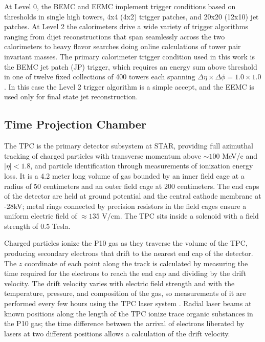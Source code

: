 At Level 0, the BEMC and EEMC implement trigger conditions based on thresholds in single high towers, 4x4 (4x2) trigger patches, and 20x20 (12x10) jet patches.  At Level 2 the calorimeters drive a wide variety of trigger algorithms ranging from dijet reconstructions that span seamlessly across the two calorimeters to heavy flavor searches doing online calculations of tower pair invariant masses.  The primary calorimeter trigger condition used in this work is the BEMC jet patch (JP) trigger, which requires an energy sum above threshold in one of twelve fixed collections of 400 towers each spanning $\Delta \eta \times \Delta \phi = 1.0 \times 1.0$.  In this case the Level 2 trigger algorithm is a simple accept, and the EEMC is used only for final state jet reconstruction.


\subsection{Time Projection Chamber}

The TPC \cite{Anderson:2003ur} is the primary detector subsystem at STAR, providing full azimuthal tracking of charged particles with transverse momentum above $\sim 100$ MeV/c and $|\eta| < 1.8$, and particle identification through measurements of ionization energy loss.  It is a 4.2 meter long volume of gas bounded by an inner field cage at a radius of 50 centimeters and an outer field cage at 200 centimeters.  The end caps of the detector are held at ground potential and the central cathode membrane at -28kV; metal rings connected by precision resistors in the field cages ensure a uniform electric field of $\approx 135$ V/cm.  The TPC sits inside a solenoid with a field strength of 0.5 Tesla.

Charged particles ionize the P10 gas as they traverse the volume of the TPC, producing secondary electrons that drift to the nearest end cap of the detector.  The $z$ coordinate of each point along the track is calculated by measuring the time required for the electrons to reach the end cap and dividing by the drift velocity.  The drift velocity varies with electric field strength and with the temperature, pressure, and composition of the gas, so measurements of it are performed every few hours using the TPC laser system \cite{Abele:2003aa}.  Radial laser beams at known positions along the length of the TPC ionize trace organic substances in the P10 gas; the time difference between the arrival of electrons liberated by lasers at two different positions allows a calculation of the drift velocity.

